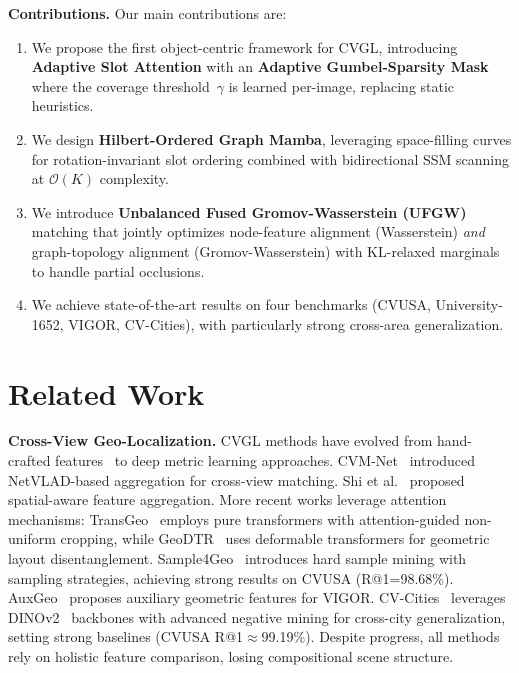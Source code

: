 \documentclass{article}
\begin{document}
\textbf{Contributions.} Our main contributions are:
\begin{enumerate}[leftmargin=1.5em,topsep=0pt,itemsep=2pt]
    \item We propose the first object-centric framework for CVGL, introducing \textbf{Adaptive Slot Attention} with an \textbf{Adaptive Gumbel-Sparsity Mask} where the coverage threshold~$\gamma$ is learned per-image, replacing static heuristics.
    \item We design \textbf{Hilbert-Ordered Graph Mamba}, leveraging space-filling curves for rotation-invariant slot ordering combined with bidirectional SSM scanning at $\mathcal{O}(K)$ complexity.
    \item We introduce \textbf{Unbalanced Fused Gromov-Wasserstein (UFGW)} matching that jointly optimizes node-feature alignment (Wasserstein) \textit{and} graph-topology alignment (Gromov-Wasserstein) with KL-relaxed marginals to handle partial occlusions.
    \item We achieve state-of-the-art results on four benchmarks (CVUSA, University-1652, VIGOR, CV-Cities), with particularly strong cross-area generalization.
\end{enumerate}

\section{Related Work}\label{sec:related}

\textbf{Cross-View Geo-Localization.}
CVGL methods have evolved from hand-crafted features~\cite{workman2015} to deep metric learning approaches. CVM-Net~\cite{cvmnet} introduced NetVLAD-based aggregation for cross-view matching. Shi et al.~\cite{shi2019spatial} proposed spatial-aware feature aggregation. More recent works leverage attention mechanisms: TransGeo~\cite{transgeo} employs pure transformers with attention-guided non-uniform cropping, while GeoDTR~\cite{geodtr} uses deformable transformers for geometric layout disentanglement. Sample4Geo~\cite{sample4geo} introduces hard sample mining with sampling strategies, achieving strong results on CVUSA (R@1=98.68\%). AuxGeo~\cite{auxgeo} proposes auxiliary geometric features for VIGOR. CV-Cities~\cite{cvcities} leverages DINOv2~\cite{dinov2} backbones with advanced negative mining for cross-city generalization, setting strong baselines (CVUSA R@1$\approx$99.19\%). Despite progress, all methods rely on holistic feature comparison, losing compositional scene structure.
\end{document}
